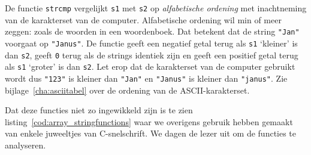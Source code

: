 De functie \texttt{strcmp} vergelijkt \texttt{s1} met \texttt{s2} op \textsl{alfabetische ordening} met inachtneming van de karakterset van de computer. Alfabetische ordening wil min of meer zeggen: zoals de woorden in een woordenboek. Dat betekent dat de string \texttt{"Jan"} voorgaat op \texttt{"Janus"}. De functie geeft een negatief getal terug als \texttt{s1} `kleiner' is dan \texttt{s2}, geeft \texttt{0} terug als de strings identiek zijn en geeft een positief getal terug als \texttt{s1} `groter' is dan \texttt{s2}. Let erop dat de karakterset van de computer gebruikt wordt dus \texttt{"123"} is kleiner dan \texttt{"Jan"} en \texttt{"Janus"} is kleiner dan \texttt{"janus"}. Zie bijlage~\ref{cha:asciitabel} over de ordening van de ASCII-karakterset.

Dat deze functies niet zo ingewikkeld zijn is te zien listing~\ref{cod:array_stringfunctions} waar we overigens gebruik hebben gemaakt van enkele juweeltjes van C-snelschrift. We dagen de lezer uit om de functies te analyseren.



